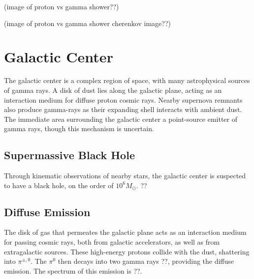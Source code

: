 (image of proton vs gamma shower??)

(image of proton vs gamma shower cherenkov image??)


\section{Galactic Center}
The galactic center is a complex region of space, with many astrophysical sources of gamma rays.
A disk of dust lies along the galactic plane, acting as an interaction medium for diffuse proton cosmic rays.
Nearby supernova remnants also produce gamma-rays as their expanding shell interacts with ambient dust.
The immediate area surrounding the galactic center a point-source emitter of gamma rays, though this mechanism is uncertain.

\subsection{Supermassive Black Hole}

Through kinematic observations of nearby stars, the galactic center is suspected to have a black hole, on the order of $10^6 M_{\odot}$. ??

\subsection{Diffuse Emission}
The disk of gas that permeates the galactic plane acts as an interaction medium for passing cosmic rays, both from galactic accelerators, as well as from extragalactic sources.
These high-energy protons collide with the dust, shattering into $\pi^{\pm,0}$.
The $\pi^0$ then decays into two gamma rays ??, providing the diffuse emission.
The spectrum of this emission is ??.


